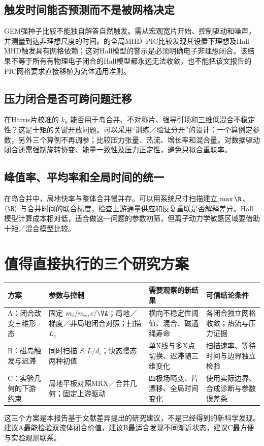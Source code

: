 \subsection{触发时间能否预测而不是被网格决定}
GEM强种子比较不能独自解答自然触发。需从宏观宽片开始、控制驱动和噪声，并测量到达非理想尺度的时间。\citet{Arshad2026}的全局MHD--PIC比较发现其设置下理想及Hall MHD触发具有网格依赖；这对Hall模型的警示是必须明确电子非理想闭合。该结果不等于所有有物理电子闭合的Hall模型都永远无法收敛，也不能把该文报告的PIC网格要求直接移植为流体通用准则。

\subsection{压力闭合是否可跨问题迁移}
在Harris片校准的 $k_0$ 能否用于岛合并、不对称片、强导引场和三维低混合不稳定性？这是十矩的关键开放问题。可以采用“训练／验证分开”的设计：一个算例定参数，另外三个算例不再调参；比较压力张量、热流、增长率和混合量。对数据驱动闭合还需强制旋转协变、能量一致性及压力正定性，避免只拟合重联率。\citep{Wang2015,Ng2020,Closure2026}

\subsection{峰值率、平均率和全局时间的统一}
在岛合并中，局地快率与整体合并慢并存。可以用系统尺寸扫描建立 $\max\R$、$\langle\R\rangle$ 与合并时间的联合标度，检查上游通量供应和反复重联是否解释差异。Hall模型计算成本相对低，适合做这一问题的参数初筛，但离子动力学敏感区域要借助十矩／混合模型比较。\citep{Knoll2006,Ng2015}

\section{值得直接执行的三个研究方案}
\begin{longtable}{P{22mm}P{44mm}P{48mm}P{35mm}}
\toprule 方案 & 参数与控制 & 需要观察的新结果 & 可信结论条件\\\midrule
A：闭合改变三维形态 & 固定 $m_i/m_e,c/\VA$；局地／梯度／非局地闭合对照；扫描 $L_z$ & 横向不稳定性阈值、混合、磁通绳寿命 & 各闭合独立网格收敛；热流与压力证据\\
B：磁岛触发与迟滞 & 同时扫描 $S,L/d_i$；快态慢态两种初值 & 单X线与多X点切换、迟滞随三维变化 & 扫描速率、等待时间与边界独立检验\\
C：实验几何的下游约束 & 局地平板对照MRX／合并几何；固定上游驱动 & 四极场畸变、片漂移、全局时间变化 & 使用实际边界、合成诊断与参数误差条\\\bottomrule
\end{longtable}
这三个方案是本报告基于文献差异提出的研究建议，不是已经得到的新科学发现。建议A最能检验双流体闭合价值，建议B最适合发现不同渐近状态，建议C最方便与实验观测联系。


